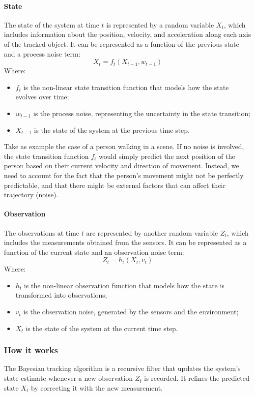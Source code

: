 \paragraph{State}
\label{bayesian-tracking:state}
The state of the system at time $t$ is represented by a random variable $X_t$, which includes information about the position, velocity, 
and acceleration along each axis of the tracked object.
It can be represented as a function of the previous state and a process noise term:
\[ X_t = f_t(X_{t-1}, w_{t-1}) \]
Where:
\begin{itemize}
    \item $f_t$ is the non-linear state transition function that models how the state evolves over time;
    \item $w_{t-1}$ is the process noise, representing the uncertainty in the state transition;
    \item $X_{t-1}$ is the state of the system at the previous time step.
\end{itemize}
Take as example the case of a person walking in a scene. If no noise is involved, the state transition function $f_t$ would simply 
predict the next position of the person based on their current velocity and direction of movement. Instead, we need to account for the fact
that the person's movement might not be perfectly predictable, and that there might be external factors that can affect their trajectory (noise).

\paragraph{Observation}
\label{bayesian-tracking:observation}
The observations at time $t$ are represented by another random variable $Z_t$, which includes the measurements obtained from the sensors.
It can be represented as a function of the current state and an observation noise term:
\[ Z_t = h_t(X_t, v_t) \]
Where:
\begin{itemize}
    \item $h_t$ is the non-linear observation function that models how the state is transformed into observations;
    \item $v_t$ is the observation noise, generated by the sensors and the environment;
    \item $X_t$ is the state of the system at the current time step.
\end{itemize}

\subsubsection{How it works}
The Bayesian tracking algorithm is a recursive filter that updates the system's state estimate whenever a 
new observation $Z_t$ is recorded. It refines the predicted state $X_t$ by correcting it with the new measurement.

